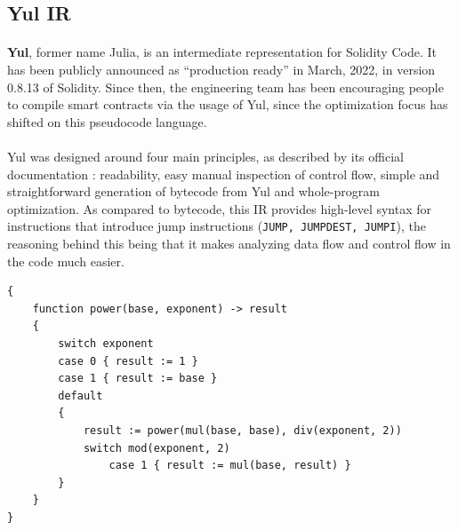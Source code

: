 

\subsection*{Yul IR}
\paragraph*{}
\textbf{Yul}, former name Julia, is an intermediate representation for Solidity Code. It has been publicly announced as ``production ready'' in March, 2022, in version 0.8.13 of Solidity. Since then, the engineering team has been encouraging people to compile smart contracts via the usage of Yul, since the optimization focus has shifted on this pseudocode language.

\paragraph*{}
Yul was designed around four main principles, as described by its official documentation \cite{yul-description}: readability, easy manual inspection of control flow, simple and straightforward generation of bytecode from Yul and whole-program optimization. As compared to bytecode, this IR provides high-level syntax for instructions that introduce jump instructions (\lstinline[columns=fixed]{JUMP, JUMPDEST, JUMPI}), the reasoning behind this being that it makes analyzing data flow and control flow in the code much easier.

\begin{lstlisting}[caption={Example of Yul code which computes exponentiation recursively}]
{
    function power(base, exponent) -> result
    {
        switch exponent
        case 0 { result := 1 }
        case 1 { result := base }
        default
        {
            result := power(mul(base, base), div(exponent, 2))
            switch mod(exponent, 2)
                case 1 { result := mul(base, result) }
        }
    }
}
\end{lstlisting}

